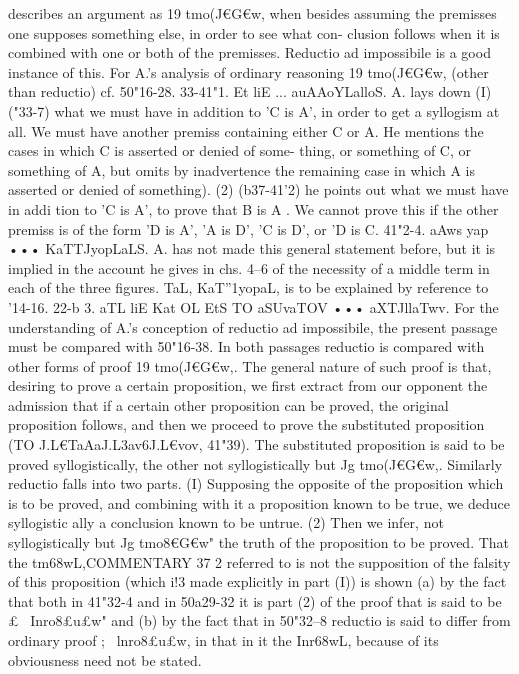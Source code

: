 {{{{{{{{{{describes an argument as 19 tmo(J€G€w, when besides assuming the
premisses one supposes something else, in order to see what con-
clusion follows when it is combined with one or both of the
premisses. Reductio ad impossibile is a good instance of this. For
A.'s analysis of ordinary reasoning 19 tmo(J€G€w, (other than
reductio) cf. 50"16-28.
33-41"1. Et liE ... auAAoYLalloS. A. lays down (I) ("33-7) what
we must have in addition to 'C is A', in order to get a syllogism
at all. We must have another premiss containing either C or A.
He mentions the cases in which C is asserted or denied of some-
thing, or something of C, or something of A, but omits by
inadvertence the remaining case in which A is asserted or denied
of something). (2) (b37-41'2) he points out what we must have in
addi tion to 'C is A', to prove that B is A . We cannot prove this
if the other premiss is of the form 'D is A', 'A is D', 'C is D', or
'D is C.
41"2-4. aAws yap ••• KaTTJyopLaLS. A. has not made this
general statement before, but it is implied in the account he gives
in chs. 4--6 of the necessity of a middle term in each of the three
figures. TaL, KaT''1yop{aL, is to be explained by reference to '14-16.
22-b 3. aTL liE Kat OL EtS TO aSUvaTOV ••• aXTJllaTwv. For the
understanding of A.'s conception of reductio ad impossibile, the
present passage must be compared with 50"16-38. In both
passages reductio is compared with other forms of proof 19
tmo(J€G€w,. The general nature of such proof is that, desiring to
prove a certain proposition, we first extract from our opponent
the admission that if a certain other proposition can be proved,
the original proposition follows, and then we proceed to prove
the substituted proposition (TO J.L€TaAaJ.L{3av6J.L€vov, 41"39). The
substituted proposition is said to be proved syllogistically, the
other not syllogistically but Jg tmo(J€G€w,. Similarly reductio falls
into two parts. (I) Supposing the opposite of the proposition
which is to be proved, and combining with it a proposition known
to be true, we deduce syllogistic ally a conclusion known to be
untrue. (2) Then we infer, not syllogistically but Jg tmo8€G€w"
the truth of the proposition to be proved. That the tm68wL,COMMENTARY
37 2
referred to is not the supposition of the falsity of this proposition
(which i!3 made explicitly in part (I)) is shown (a) by the fact
that both in 41"32-4 and in 50a29-32 it is part (2) of the proof that
is said to be £~ Inro8£u£w" and (b) by the fact that in 50"32--8
reductio is said to differ from ordinary proof ;~ lnro8£u£w, in that
in it the Inr68wL, because of its obviousness need not be stated.
}}}}}}}}}}}}
